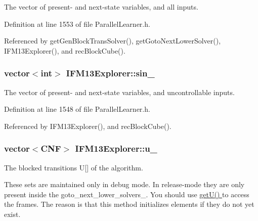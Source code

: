 The vector of present-\/ and next-\/state variables, and all inputs. 



Definition at line 1553 of file Parallel\-Learner.\-h.



Referenced by get\-Gen\-Block\-Trans\-Solver(), get\-Goto\-Next\-Lower\-Solver(), I\-F\-M13\-Explorer(), and rec\-Block\-Cube().

\hypertarget{classIFM13Explorer_a972f36d23d8990dde764f4ee877620fa}{
\subsubsection[{sin\-\_\-}]{\setlength{\rightskip}{0pt plus 5cm}vector$<$int$>$ I\-F\-M13\-Explorer\-::sin\-\_\-\hspace{0.3cm}{\ttfamily [protected]}}}\label{classIFM13Explorer_a972f36d23d8990dde764f4ee877620fa}


The vector of present-\/ and next-\/state variables, and uncontrollable inputs. 



Definition at line 1548 of file Parallel\-Learner.\-h.



Referenced by I\-F\-M13\-Explorer(), and rec\-Block\-Cube().

\hypertarget{classIFM13Explorer_a1f8ea34a97c568894a23a7361339f9ec}{
\subsubsection[{u\-\_\-}]{\setlength{\rightskip}{0pt plus 5cm}vector$<${\bf C\-N\-F}$>$ I\-F\-M13\-Explorer\-::u\-\_\-\hspace{0.3cm}{\ttfamily [protected]}}}\label{classIFM13Explorer_a1f8ea34a97c568894a23a7361339f9ec}


The blocked transitions U\mbox{[}\mbox{]} of the algorithm. 

These sets are maintained only in debug mode. In release-\/mode they are only present inside the goto\-\_\-next\-\_\-lower\-\_\-solvers\-\_\-. You should use \hyperlink{classIFM13Explorer_a2816b4c9f2cb02958e660a872f43fe4b}{get\-U() } to access the frames. The reason is that this method initializes elements if they do not yet exist. 

